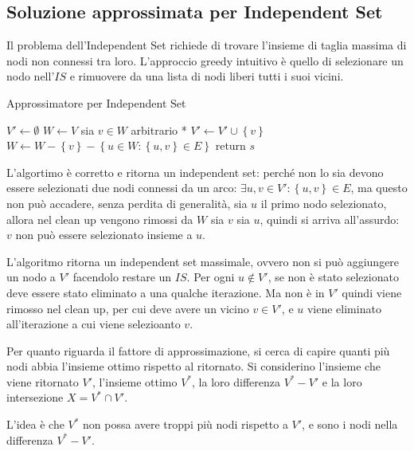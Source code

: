 \subsection{Soluzione approssimata per Independent Set}

Il problema dell'Independent Set richiede di trovare l'insieme di taglia massima di nodi non connessi tra loro.
L'approccio greedy intuitivo è quello di selezionare un nodo nell'$IS$ e rimuovere da una lista di nodi liberi tutti i suoi vicini.
\begin{algorithm}[H]
\caption{Approssimatore per Independent Set}\label{alg:is_approx}
\begin{algorithmic}[1]
        \State $V' \gets \emptyset$
        \State $W \gets V$
            \State * sia $v \in W$ arbitrario *
            \State $V' \gets V' \cup \left\{ v \right\}$
            \State $W \gets W - \left\{ v \right\}
            - \left\{ u \in W : \left\{ u,v \right\} \in E \right\}
            $
        \EndWhile
        \State return $s$
    \EndProcedure
\end{algorithmic}
\end{algorithm}
L'algortimo è corretto e ritorna un independent set: perché non lo sia devono essere selezionati due nodi connessi da un arco: $
\exists u, v \in V' :
\left\{ u, v \right\} \in E
$, ma questo non può accadere, 
senza perdita di generalità, sia $u$ il primo nodo selezionato, allora nel clean up vengono rimossi da $W$ sia $v$ sia $u$, quindi si arriva all'assurdo: $v$ non può essere selezionato insieme a $u$.

L'algoritmo ritorna un independent set massimale, ovvero non si può aggiungere un nodo a $V'$ facendolo restare un $IS$.
Per ogni $u \notin V'$, se non è stato selezionato deve essere stato eliminato a una qualche iterazione. Ma non è in $V'$ quindi viene rimosso nel clean up, per cui deve avere un vicino $v \in V'$, e $u$ viene eliminato all'iterazione a cui viene selezioanto $v$.

Per quanto riguarda il fattore di approssimazione,
si cerca di capire quanti più nodi abbia l'insieme ottimo rispetto al ritornato.
Si considerino l'insieme
che viene ritornato
$V'$,
l'insieme ottimo 
$V^*$,
la loro differenza $
V^* - V'
$
e la loro intersezione
$X = V^* \cap V'$.

L'idea è che $V^*$ non possa avere troppi più nodi rispetto a $V'$,
e sono i nodi nella differenza $
V^* - V'
$.

